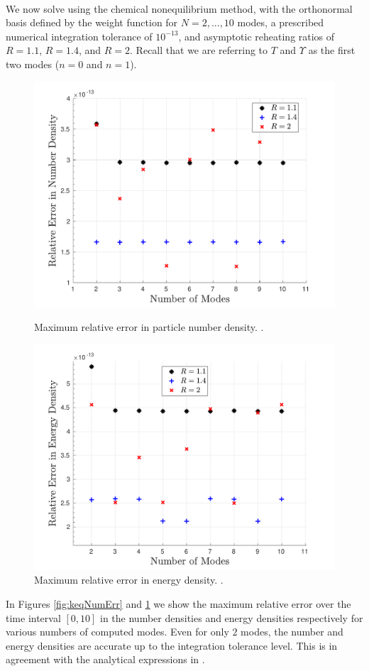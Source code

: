 \\
We now solve   using the chemical nonequilibrium method, with the orthonormal basis defined by the weight function  for $N=2,...,10$ modes, a prescribed numerical integration tolerance of $10^{-13}$, and asymptotic reheating ratios of $R=1.1$, $R=1.4$, and $R=2$.  Recall that we are referring to $T$ and $\Upsilon$ as the first two modes ($n=0$ and $n=1$). 
\begin{figure}[ht]
\centerline{\includegraphics[width=0.9\linewidth]{06-appendix/SpectralMethodBoltzmann/Figures/keq_num_err.pdf}}
\caption{Maximum relative error in particle number density. .}\label{fig:keqNumErr}
 \centerline{\includegraphics[width=0.9\linewidth]{06-appendix/SpectralMethodBoltzmann/Figures/keq_E_err.pdf}}
\caption{Maximum relative error in energy density. .}\label{fig:keqEerr}
\end{figure}
In Figures \ref{fig:keqNumErr} and  \ref{fig:keqEerr} we show the maximum relative error over the time interval $[0,10]$ in the number densities and energy densities respectively for various numbers of computed modes. Even for only $2$ modes, the number and energy densities are accurate up to the integration tolerance level.  This is in agreement with the analytical expressions in .



